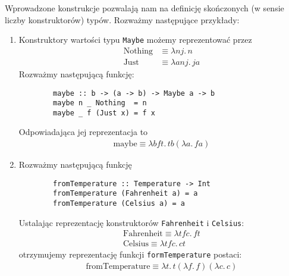\begin{przyklad}
  Wprowadzone konstrukcje pozwalają nam na definicję skończonych (w sensie liczby konstruktorów) typów. Rozważmy następujące przykłady:
  \begin{enumerate}[label=\alph*)]
    \setlength\itemsep{0em}
    \item Konstruktory wartości typu \texttt{Maybe} możemy reprezentować przez
      \begin{align*}
        \mathrm{Nothing}&\equiv \lambda nj.\,n\\
        \mathrm{Just}&\equiv \lambda anj.\,j a
      \end{align*}
      Rozważmy następującą funkcję:
      \begin{verbatim}
        maybe :: b -> (a -> b) -> Maybe a -> b
        maybe n _ Nothing  = n
        maybe _ f (Just x) = f x
      \end{verbatim}
      Odpowiadająca jej reprezentacja to
      \begin{align*}
        \mathrm{maybe} \equiv \lambda b f t.\, tb(\lambda a.\,fa)
      \end{align*}
    \item Rozważmy następującą funkcję
      \begin{verbatim}
        fromTemperature :: Temperature -> Int
        fromTemperature (Fahrenheit a) = a
        fromTemperature (Celsius a) = a
      \end{verbatim}
      Ustalając reprezentację konstruktorów \texttt{Fahrenheit} i \texttt{Celsius}:
      \begin{align*}
        \mathrm{Fahrenheit}\equiv \lambda tfc.\,ft\\
        \mathrm{Celsius}\equiv \lambda tfc.\,ct
      \end{align*}
      otrzymujemy reprezentację funkcji \texttt{formTemperature} postaci:
      \begin{align*}
        \mathrm{fromTemperature}\equiv\lambda t.\,t(\lambda f.\,f)(\lambda c.\,c)
      \end{align*}
  \end{enumerate}
\end{przyklad}

